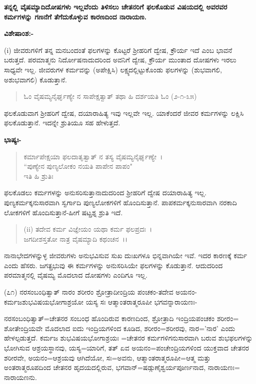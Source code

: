 \begin{center}
\textbf{ತನ್ನಲ್ಲಿ ವೈಷಮ್ಯಾದಿದೋಷಗಳು ಇಲ್ಲವೆಂದು ತಿಳಿಸಲು ಚೇತನರಿಗೆ ಫಲಕೊಡುವ ವಿಷಯದಲ್ಲಿ ಅವರವರ ಕರ್ಮಗಳನ್ನು ಗಣನೆಗೆ ತೆಗೆದುಕೊಳ್ಳುವ ಕಾರಣದಿಂದ ನಾರಾಯಣ.}
\end{center}

\noindent
\textbf{ವಿಶೇಷಾಂಶ:-}

(i) ಜೀವರುಗಳಿಗೆ ತನ್ನ ಮನಬಂದಂತೆ ಫಲಗಳನ್ನು ಕೊಟ್ಟರೆ ಶ‍್ರೀಹರಿಗೆ ದ್ವೇಷ, ಕ್ರೌರ್ಯ ಇದೆ ಎಂಬ ಭಾವನೆ ಬರುತ್ತದೆ. ಪರಮಾತ್ಮನು ನಿರ್ದೋಷನಾದುದರಿಂದ ಅವನಿಗೆ ದ್ವೇಷ, ಕ್ರೌರ್ಯ ಮುಂತಾದ ದೋಷಗಳು ಇರಲು ಸಾಧ್ಯವೇ ಇಲ್ಲ. ಜೀವರುಗಳ ಕರ್ಮವನ್ನು (ಅಪೇಕ್ಷಿಸಿ) ಲಕ್ಷ್ಯದಲ್ಲಿಟ್ಟುಕೊಂಡು ಫಲಗಳನ್ನು (ಶುಭವಾಗಲಿ, ಅಶುಭವಾಗಲಿ) ಕೊಡುತ್ತಾನೆ.

\begin{verse}
ಓಂ ವೈಷಮ್ಯನೈರ್ಘೃಣ್ಯೇ ನ ಸಾಪೇಕ್ಷತ್ವಾತ್ ತಥಾ ಹಿ ದರ್ಶಯತಿ ಓಂ (೨-೧-೩೫)
\end{verse}

ಫಲಕೊಡುವಾಗ ಶ‍್ರೀಹರಿಗೆ ದ್ವೇಷ, ದಯಾರಾಹಿತ್ಯ ಇವು ಇಲ್ಲವೇ ಇಲ್ಲ. ಯಾಕೆಂದರೆ ಜೀವರ ಕರ್ಮಗಳನ್ನು ಲಕ್ಷಿಸಿ ಫಲಕೊಡುತ್ತಾನೆ. ಇದನ್ನೇ ಶ್ರುತಿಯೂ ಸಹ ಹೇಳುತ್ತದೆ.

\noindent
\textbf{ಭಾಷ್ಯಃ-}

\begin{verse}
ಕರ್ಮಾಪೇಕ್ಷಯಾ ಫಲದಾತೃತ್ವಾತ್ ನ ತಸ್ಯ ವೈಷಮ್ಯನೈರ್ಘೃಣ್ಯೇ~।\\ ``ಪುಣ್ಯೇನ ಪುಣ್ಯಲೋಕಂ ನಯತಿ ಪಾಪೇನ ಪಾಪಂ"\\ಇತಿ ಹಿ ಶ್ರುತಿಃ
\end{verse}

ಫಲಕೊಡಲು ಕರ್ಮಗಳನ್ನು ಅನುಸರಿಸುತ್ತಾನಾದುದರಿಂದ ಶ‍್ರೀಹರಿಗೆ ದ್ವೇಷ ದಯಾರಾಹಿತ್ಯ ಇಲ್ಲ. ಪುಣ್ಯಕರ್ಮಕ್ಕನುಸಾರವಾಗಿ ಸ್ವರ್ಗಾದಿ ಪುಣ್ಯಲೋಕಗಳಿಗೆ ಹೊಂದಿಸುತ್ತಾನೆ. ಪಾಪಕರ್ಮಕ್ಕನುಸಾರವಾಗಿ ನರಕಾದಿ ಲೋಕಗಳಿಗೆ ಹೊಂದಿಸುತ್ತಾನೆ-ಹೀಗೆ ಷಟ್ಪ್ರಶ್ನ ಶ್ರುತಿ ಇದೆ.

\begin{verse}
(ii) ತದೇವ ಕರ್ಮ ವಿಜ್ಞೇಯಂ ಯಥಾ ಕರ್ಮ ಫಲಪ್ರದಃ~।\\ ಜಗದೀಶಸ್ತತೋ ನಾತ್ರ ವೈಷಮ್ಯಾದಿ ಕಥಂಚನ~।।
\end{verse}


ನಾನಾಭೇದಗಳನ್ನುಳ್ಳ ಜೀವರುಗಳು ಅನುಭವಿಸುವ ಸುಖ ದುಃಖಗಳೂ ಭಿನ್ನವಾಗಿಯೇ ಇವೆ. ಇದರ ಕಾರಣಕ್ಕೆ ಕರ್ಮ ಎಂದು ಹೆಸರು. ಜಗತ್ಪ್ರಭುವು ಈ ಕರ್ಮಗಳನ್ನು ಅನುಸರಿಸಿಯೇ ಫಲಗಳನ್ನು ಕೊಡುತ್ತಾನೆ. ಆದುದರಿಂದ ಪರಮಾತ್ಮನಲ್ಲಿ ವೈಷಮ್ಯ ಮೊದಲಾದ ದೋಷಗಳು ಎಂದಿಗೂ ಇಲ್ಲ.

(೭೧) ನರಸಂಬಂಧಿತ್ವಾತ್ ನಾರಂ ಶರೀರಂ ಶ್ರೋತ್ರಾದೀಂದ್ರಿಯ ಪಂಚಕಂ-ತದೇವ ಅಯನಂ-ಕರ್ಮಜಶುಭವಿಷಯಭೋಗಾಶ್ರಯೋ ಯಸ್ಯ ಸಃ ಆತ್ಮಾಂತರಾತ್ಮರೂಪೀ ಭಗವನ್ನಾರಾಯಣಃ-

ನರಸಂಬಂಧಿತ್ವಾತ್=ಚೇತನರ ಸಂಬಂಧ ಹೊಂದಿರುವ ಕಾರಣದಿಂದ, ಶ್ರೋತ್ರಾದಿ ಇಂದ್ರಿಯಪಂಚಕಂ ಶರೀರಂ= ಶೋತೇಂದ್ರಿಯವೇ ಮೊದಲಾದ ಐದು ಇಂದ್ರಿಯಗಳಿಂದ ಕೂಡಿದ, ಶರೀರಂ=ಶರೀರವು, ನಾರ='ನಾರ' ಎಂದು ಹೇಳಲ್ಪಡುತ್ತದೆ. ಕರ್ಮಜ ಶುಭವಿಷಯಭೋಗಾಶ್ರಯಃ =ಚೇತನರ ಕರ್ಮಗಳಿಗನುಸಾರವಾಗಿ ಬರುವ ಶುಭಫಲಗಳನ್ನು ಭೋಗಿಸುವ ಆಶ್ರಯಸ್ಥಾನವು, ಯಸ್ಯ=ಯಾರಿಗೆ, ತತ್ ಏವ ಅಯನಂ=ಪಂಚೇಂದ್ರಿಯಗಳಿಂದ ಯುಕ್ತವಾದ ಚೇತನರ ಶರೀರವೇ, ಅಯನಂ=ಆಶ್ರಯವು ಆಗಿದೆಯೋ, ಸಃ=ಅವನು, ಆತ್ಮಾಂತರಾತ್ಮರೂಪೀ=ಆತ್ಮ ಮತ್ತು ಅಂತರಾತ್ಮರೂಪದಿಂದ ಚೇತನರ ಹೃದಯದಲ್ಲಿರುವ, ಭಗವಾನ್=ಷಡ್ಗುಣೈಶ್ವರ್ಯಪೂರ್ಣನಾದ, ನಾರಾಯಣಃ= ನಾರಾಯಣನು.

